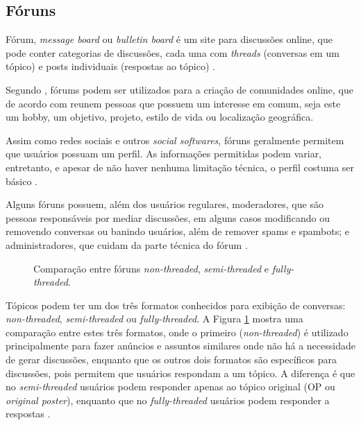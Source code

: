 \documentclass[diss]{template/setrem}
\begin{document}
\subsection{Fóruns}
\label{subsec:forums}
Fórum, \emph{message board} ou \emph{bulletin board} é um site para discussões online, que pode conter categorias de discussões, cada uma com \emph{threads} (conversas em um tópico) e posts individuais (respostas ao tópico) \citep{vBulletin2012}.

Segundo \citet{Farkas2007}, fórums podem ser utilizados para a criação de comunidades online, que de acordo com \citet{Wu2010} reunem pessoas que possuem um interesse em comum, seja este um hobby, um objetivo, projeto, estilo de vida ou localização geográfica.

Assim como redes sociais e outros \emph{social softwares}, fóruns geralmente permitem que usuários possuam um perfil. As informações permitidas podem variar, entretanto, e apesar de não haver nenhuma limitação técnica, o perfil costuma ser básico \citep{Bell2009}.

Alguns fóruns possuem, além dos usuários regulares, moderadores, que são pessoas responsáveis por mediar discussões, em alguns casos modificando ou removendo conversas ou banindo usuários, além de remover spams e spambots; e administradores, que cuidam da parte técnica do fórum \citep{vBulletin2012}.

\begin{figure}[!h]
    \caption{Comparação entre fóruns \emph{non-threaded}, \emph{semi-threaded} e \emph{fully-threaded}.}
    \label{fig:thread-vs-nonthread}
\end{figure}

Tópicos podem ter um dos três formatos conhecidos para exibição de conversas: \emph{non-threaded}, \emph{semi-threaded} ou \emph{fully-threaded}. A Figura \ref{fig:thread-vs-nonthread} mostra uma comparação entre estes três formatos, onde o primeiro (\emph{non-threaded}) é utilizado principalmente para fazer anúncios e assuntos similares onde não há a necessidade de gerar discussões, enquanto que os outros dois formatos são específicos para discussões, pois permitem que usuários respondam a um tópico. A diferença é que no \emph{semi-threaded} usuários podem responder apenas ao tópico original (OP ou \emph{original poster}), enquanto que no \emph{fully-threaded} usuários podem responder a respostas \citep{BulletinBoards2012}.
\end{document}
